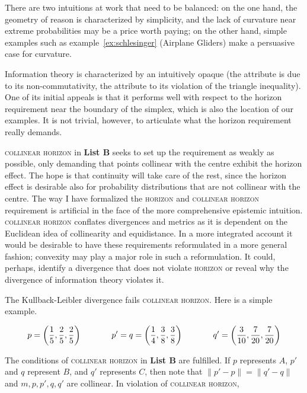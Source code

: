 \documentclass[12pt]{article}
\begin{document}
There are two intuitions at work that need to be balanced: on the one
hand, the geometry of reason is characterized by simplicity, and the
lack of curvature near extreme probabilities may be a price worth
paying; on the other hand, simple examples such as
example~\ref{ex:schlesinger} (Airplane Gliders) make a persuasive case
for curvature.

Information theory is characterized by an intuitively opaque
 (the attribute  is due to its
non-commutativity, the attribute  to its violation of the
triangle inequality). One of its initial appeals is that it performs
well with respect to the horizon requirement near the boundary of the
simplex, which is also the location of our examples. It is not
trivial, however, to articulate what the horizon requirement really
demands.

\textsc{collinear horizon} in \textbf{List B} seeks to set up the
requirement as weakly as possible, only demanding that points
collinear with the centre exhibit the horizon effect. The hope is that
continuity will take care of the rest, since the horizon effect is
desirable also for probability distributions that are not collinear
with the centre. The way I have formalized the \textsc{horizon} and
\textsc{collinear horizon} requirement is artificial in the face of
the more comprehensive epistemic intuition. \textsc{collinear horizon}
conflates divergences and metrics as it is dependent on the Euclidean
idea of collinearity and equidistance. In a more integrated account it
would be desirable to have these requirements reformulated in a more
general fashion; convexity may play a major role in such a
reformulation. It could, perhaps, identify a divergence that does not
violate \textsc{horizon} or reveal why the divergence of information
theory violates it.

The Kullback-Leibler divergence fails \textsc{collinear horizon}. Here
is a simple example.

\begin{equation}
  \label{eq:ubiesohx}
    p=\left(\frac{1}{5},\frac{2}{5},\frac{2}{5}\right) \hspace{.5in}
    p'=q=\left(\frac{1}{4},\frac{3}{8},\frac{3}{8}\right)  \hspace{.5in}
    q'=\left(\frac{3}{10},\frac{7}{20},\frac{7}{20}\right)
\end{equation}

The conditions of \textsc{collinear horizon} in \textbf{List B} are
fulfilled. If $p$ represents $A$, $p'$ and $q$ represent $B$, and $q'$
represents $C$, then note that $\|p'-p\|=\|q'-q\|$ and $m,p,p',q,q'$
are collinear. In violation of \textsc{collinear horizon},
\end{document}
